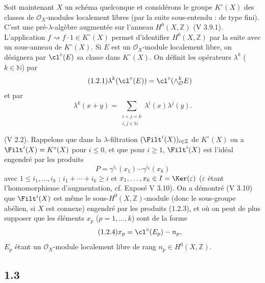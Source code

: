 Soit maintenant $X$ un schéma quelconque et considérons le groupe $K^\circ(X)$ des classes de $\mathcal O_X$-modules localement libres (par la suite sous-entendu : de type fini). C'est une pré-$\lambda$-algèbre augmentée sur l'anneau $H^0(X,\mathbb Z)$ (V 3.9.1). L'application $f\rightsquigarrow f\cdot1\in K^\circ(X)$ permet d'identifier $H^0(X,\mathbb Z)$ par la suite avec un sous-anneau de $K^\circ(X)$. Si $E$ est un $\mathcal O_X$-module localement libre, on désignera par $\cl^\circ(E)$ sa classe dans $K^\circ(X)$. On définit les opérateurs $\lambda^k$ ($k\in\mathbb N$) par
\begin{equation}\tag{1.2.1}
\lambda^k(\cl^\circ(E))=\cl^\circ(\wedge_{\mathcal O}^kE)
\end{equation}
et par
\begin{equation}\tag{1.2.2}
\lambda^k(x+y)=\sum_{\substack{i+j=k\\ i,j\in\mathbb N}}\lambda^i(x)\lambda^j(y).
\end{equation}

(V 2.2). Rappelons que dans la $\lambda$-filtration $(\Filt^i(X))_{i\in\mathbb Z}$ de $K^\circ(X)$ on a $\Filt^i(X)=K^\circ(X)$ pour $i\leq0$, et que pour $i\geq1$, $\Filt^i(X)$ est l'idéal engendré par les produits
\begin{equation}\tag{1.2.3}
P=\gamma^{i_1}(x_1)\cdots\gamma^{i_k}(x_k)
\end{equation}
avec $1\leq i_1,\ldots,i_k$ ; $i_1+\cdots+i_k\geq i$ et $x_1,\ldots,x_k\in I=\Ker(\varepsilon)$ ($\varepsilon$ étant l'homomorphisme d'augmentation, cf. Exposé V 3.10). On a démontré (V 3.10) que $\Filt^i(X)$ est même le sous-$H^0(X,\mathbb Z)$-module (donc le sous-groupe abélien, si $X$ est connexe) engendré par les produits (1.2.3), et où on peut de plus supposer que les éléments $x_p$ ($p=1,\ldots,k$) sont de la forme
\begin{equation}\tag{1.2.4}
x_p=\cl^\circ(E_p)-n_p,
\end{equation}
$E_p$ étant un $\mathcal O_X$-module localement libre de rang $n_p\in H^0(X,\mathbb Z)$.

\subsection*{1.3}
